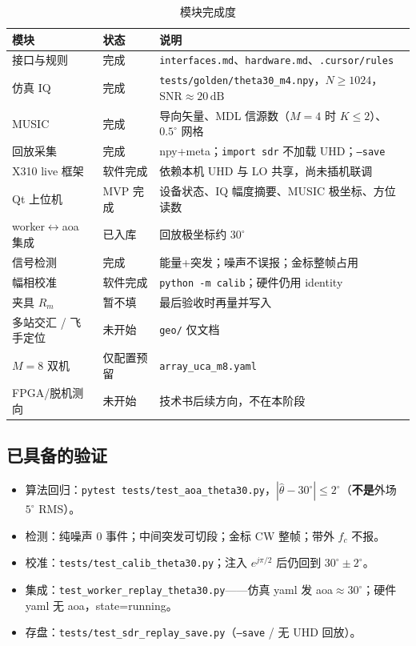 \documentclass[UTF8,a4paper,12pt,zihao=-4]{ctexart}
\newcommand{\done}[1]{\textcolor{doneC}{#1}}
\newcommand{\pend}[1]{\textcolor{pendC}{#1}}
\newcommand{\remind}[1]{\textcolor{remindC}{#1}}
\begin{document}
\begin{table}[htbp]
\centering
\caption{模块完成度}
\begin{tabular}{@{}llp{6.8cm}@{}}
\toprule
模块 & 状态 & 说明 \\
\midrule
接口与规则 & 完成 & \texttt{interfaces.md}、\texttt{hardware.md}、\texttt{.cursor/rules} \\
仿真 IQ & 完成 & \texttt{tests/golden/theta30\_m4.npy}，$N\ge 1024$，SNR$\approx 20\,\mathrm{dB}$ \\
MUSIC & 完成 & 导向矢量、MDL 信源数（$M=4$ 时 $K\le 2$）、$0.5^\circ$ 网格 \\
回放采集 & \done{完成} & npy+meta；\texttt{import sdr} 不加载 UHD；\done{\texttt{--save}} \\
X310 live 框架 & \done{软件完成} & \pend{依赖本机 UHD 与 LO 共享，尚未插机联调} \\
Qt 上位机 & MVP 完成 & 设备状态、IQ 幅度摘要、MUSIC 极坐标、方位读数 \\
worker$\leftrightarrow$aoa 集成 & \done{已入库} & \done{回放极坐标约 $30^\circ$} \\
信号检测 & \done{完成} & \done{能量+突发；噪声不误报；金标整帧占用} \\
幅相校准 & \done{软件完成} & \done{\texttt{python -m calib}}；硬件仍用 identity \\
夹具 $R_m$ & \remind{暂不填} & \remind{最后验收时再量并写入} \\
多站交汇 / 飞手定位 & 未开始 & \texttt{geo/} 仅文档 \\
$M=8$ 双机 & 仅配置预留 & \texttt{array\_uca\_m8.yaml} \\
FPGA/脱机测向 & 未开始 & 技术书后续方向，不在本阶段 \\
\bottomrule
\end{tabular}
\end{table}

\subsection{已具备的验证}

\begin{itemize}[leftmargin=2em]
  \item 算法回归：\texttt{pytest tests/test\_aoa\_theta30.py}，$|\hat\theta-30^\circ|\le 2^\circ$（\textbf{不是}外场 $5^\circ$ RMS）。
  \item \done{检测：纯噪声 0 事件；中间突发可切段；金标 CW 整帧；带外 $f_c$ 不报。}
  \item \done{校准：\texttt{tests/test\_calib\_theta30.py}；注入 $e^{j\pi/2}$ 后仍回到 $30^\circ\pm 2^\circ$。}
  \item \done{集成：\texttt{test\_worker\_replay\_theta30.py}——仿真 yaml 发 aoa$\approx 30^\circ$；硬件 yaml 无 aoa，state=running。}
  \item \done{存盘：\texttt{tests/test\_sdr\_replay\_save.py}（\texttt{--save} / 无 UHD 回放）。}
\end{itemize}
\end{document}
